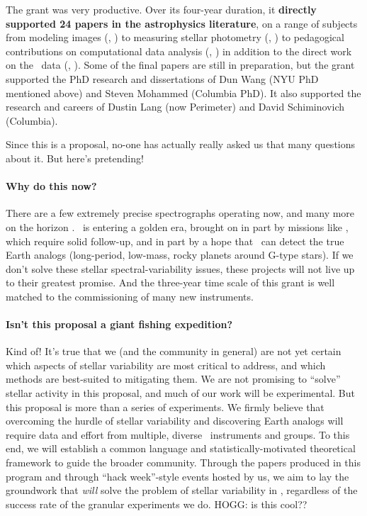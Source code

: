 \documentclass[12pt, letterpaper]{article}
\begin{document}
The grant was very productive. Over its four-year duration, it
\textbf{directly supported 24 papers in the astrophysics literature}, on a
range of subjects from modeling images (\eg, \citealt{UNWISE})
to measuring stellar photometry (\eg, \citealt{CPM})
to pedagogical contributions on computational data analysis (\eg, \citealt{MCMC})
in addition to the direct work on the \GALEX\ data (\eg, \citealt{Mohammed}).
Some of the final papers are still in preparation, but the grant
supported the PhD research and dissertations of Dun Wang (NYU PhD
mentioned above) and Steven Mohammed (Columbia PhD).
It also supported the research and careers of Dustin Lang (now
Perimeter) and David Schiminovich (Columbia).


Since this is a proposal, no-one has actually really asked us that many questions
about it. But here's pretending!

\paragraph{Why do this now?}
There are a few extremely precise spectrographs operating now, 
and many more on the horizon \citep{Wright2017}.
\EPRV\ is entering a golden era, brought on in part by missions like
\TESS, which require solid follow-up, and in part by a hope that
\EPRV\ can detect the true Earth analogs (long-period, low-mass, rocky
planets around G-type stars).
If we don't solve these stellar spectral-variability issues, these
projects will not live up to their greatest promise.
And the three-year time scale of this grant is well matched to the
commissioning of many new instruments.

\paragraph{Isn't this proposal a giant fishing expedition?}
Kind of! It's true that we (and the community in general) are not yet certain 
which aspects of stellar variability are most critical to address, and which 
methods are best-suited to mitigating them. We are not promising to 
``solve'' stellar activity in this proposal, and much of our work will be 
experimental. But this proposal is more than a series of experiments. 
We firmly believe that overcoming the hurdle of stellar variability and 
discovering Earth analogs will require data and effort from multiple, 
diverse \EPRV\ instruments and groups. To this end, we will establish 
a common language and statistically-motivated theoretical framework 
to guide the broader community. Through the papers produced in this 
program and through ``hack week''-style events hosted by us, we aim to 
lay the groundwork that \textit{will} solve the problem of stellar variability 
in \EPRV, regardless of the success rate of the granular experiments we do. 
HOGG: is this cool??
\end{document}
